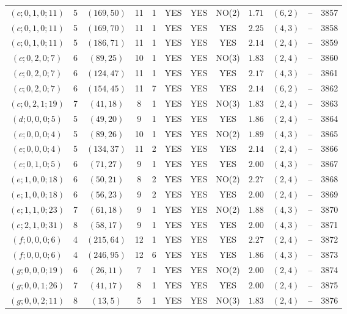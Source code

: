 \begin{longtable}{|c|c|c|c|c|c|c|c|c|c|c|c|}
$(c;0,1,0;11)$ & 5 & $(169,50)$ & 11 & 1 & YES & YES & NO(2) & $1.71$ & $(6,2)$ & -- & 3857\\
$(c;0,1,0;11)$ & 5 & $(169,70)$ & 11 & 1 & YES & YES & YES & $2.25$ & $(4,3)$ & -- & 3858\\
$(c;0,1,0;11)$ & 5 & $(186,71)$ & 11 & 1 & YES & YES & YES & $2.14$ & $(2,4)$ & -- & 3859\\
$(c;0,2,0;7)$ & 6 & $(89,25)$ & 10 & 1 & YES & YES & NO(3) & $1.83$ & $(2,4)$ & -- & 3860\\
$(c;0,2,0;7)$ & 6 & $(124,47)$ & 11 & 1 & YES & YES & YES & $2.17$ & $(4,3)$ & -- & 3861\\
$(c;0,2,0;7)$ & 6 & $(154,45)$ & 11 & 7 & YES & YES & YES & $2.14$ & $(6,2)$ & -- & 3862\\
$(c;0,2,1;19)$ & 7 & $(41,18)$ & 8 & 1 & YES & YES & NO(3) & $1.83$ & $(2,4)$ & -- & 3863\\
$(d;0,0,0;5)$ & 5 & $(49,20)$ & 9 & 1 & YES & YES & YES & $1.86$ & $(2,4)$ & -- & 3864\\
$(e;0,0,0;4)$ & 5 & $(89,26)$ & 10 & 1 & YES & YES & NO(2) & $1.89$ & $(4,3)$ & -- & 3865\\
$(e;0,0,0;4)$ & 5 & $(134,37)$ & 11 & 2 & YES & YES & YES & $2.14$ & $(2,4)$ & -- & 3866\\
$(e;0,1,0;5)$ & 6 & $(71,27)$ & 9 & 1 & YES & YES & YES & $2.00$ & $(4,3)$ & -- & 3867\\
$(e;1,0,0;18)$ & 6 & $(50,21)$ & 8 & 2 & YES & YES & NO(2) & $2.27$ & $(2,4)$ & -- & 3868\\
$(e;1,0,0;18)$ & 6 & $(56,23)$ & 9 & 2 & YES & YES & YES & $2.00$ & $(2,4)$ & -- & 3869\\
$(e;1,1,0;23)$ & 7 & $(61,18)$ & 9 & 1 & YES & YES & NO(2) & $1.88$ & $(4,3)$ & -- & 3870\\
$(e;2,1,0;31)$ & 8 & $(58,17)$ & 9 & 1 & YES & YES & YES & $2.00$ & $(4,3)$ & -- & 3871\\
$(f;0,0,0;6)$ & 4 & $(215,64)$ & 12 & 1 & YES & YES & YES & $2.27$ & $(2,4)$ & -- & 3872\\
$(f;0,0,0;6)$ & 4 & $(246,95)$ & 12 & 6 & YES & YES & YES & $1.86$ & $(4,3)$ & -- & 3873\\
$(g;0,0,0;19)$ & 6 & $(26,11)$ & 7 & 1 & YES & YES & NO(2) & $2.00$ & $(2,4)$ & -- & 3874\\
$(g;0,0,1;26)$ & 7 & $(41,17)$ & 8 & 1 & YES & YES & YES & $2.00$ & $(2,4)$ & -- & 3875\\
$(g;0,0,2;11)$ & 8 & $(13,5)$ & 5 & 1 & YES & YES & NO(3) & $1.83$ & $(2,4)$ & -- & 3876\\

\end{longtable}
